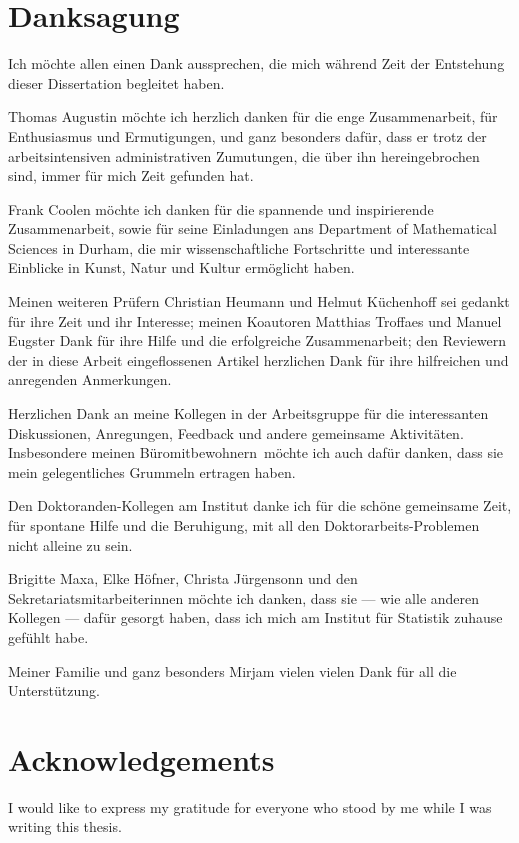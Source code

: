 
{}
\chapter*{Danksagung}

Ich möchte allen einen Dank aussprechen,
die mich während Zeit der Entstehung dieser Dissertation begleitet haben.

Thomas Augustin möchte ich herzlich danken für die enge Zusammenarbeit,
für Enthusiasmus und Ermutigungen, und ganz besonders dafür, dass er
trotz der arbeitsintensiven administrativen Zumutungen,
die über ihn hereingebrochen sind, immer für mich Zeit gefunden hat.

Frank Coolen möchte ich danken für die spannende und inspirierende Zusammenarbeit,
sowie für seine Einladungen ans Department of Mathematical Sciences in Durham,
die mir wissenschaftliche Fortschritte und interessante Einblicke in Kunst, Natur und Kultur ermöglicht haben.

Meinen weiteren Prüfern Christian Heumann und Helmut Küchenhoff sei gedankt für ihre Zeit und ihr Interesse;
meinen Koautoren Matthias Troffaes und Manuel Eugster Dank für ihre Hilfe und die erfolgreiche Zusammenarbeit;
den Reviewern der in diese Arbeit eingeflossenen Artikel herzlichen Dank für ihre hilfreichen und anregenden Anmerkungen.

Herzlichen Dank an meine Kollegen in der Arbeitsgruppe für die interessanten Diskussionen, Anregungen, Feedback
und andere gemeinsame Aktivitäten.
Insbesondere meinen \glqq Büromitbewohnern\grqq\ möchte ich auch dafür danken,
dass sie mein gelegentliches Grummeln ertragen haben.

Den Doktoranden-Kollegen am Institut danke ich für die schöne gemeinsame Zeit,
für spontane Hilfe und die Beruhigung, mit all den Doktorarbeits-Problemen nicht alleine zu sein.

Brigitte Maxa, Elke Höfner, Christa Jürgensonn und den Sekretariatsmitarbeiterinnen
möchte ich danken, dass sie --- wie alle anderen Kollegen --- dafür gesorgt haben,
dass ich mich am Institut für Statistik zuhause gefühlt habe.

Meiner Familie und ganz besonders Mirjam vielen vielen Dank für all die Unterstützung.\\

\chapter*{Acknowledgements}
I would like to express my gratitude for everyone who stood by me while I was writing this thesis.

